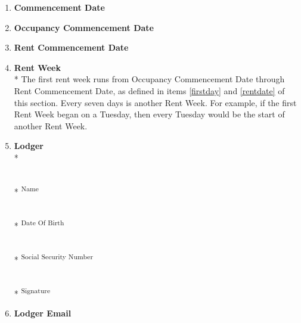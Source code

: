 \documentclass[12pt,letterpaper]{article}
\newcommand{\signdate}{Commencement Date}
\newcommand{\firstday}{Occupancy Commencement Date}
\newcommand{\rentdate}{Rent Commencement Date}
\newcommand{\rentweek}{Rent Week}
\newcommand{\lodger}{Lodger}
\newcommand{\lemail}{Lodger Email}
\begin{document}
\begin{multicols}{2}
\begin{enumerate}
		\item \textbf{\signdate{}} \label{signdate}

			\vspace{0.5cm}\makebox[2in]{\hrulefill}

		\item \textbf{\firstday{}} \label{firstday}

			\vspace{0.5cm}\makebox[2in]{\hrulefill}

		\item \textbf{\rentdate{}} \label{rentdate}
			
			\vspace{0.5cm}\makebox[2in]{\hrulefill}

		\item \textbf{\rentweek{}}\\* \label{rentweek}
			The first rent week runs from \firstday{} through \rentdate{}, as defined in items \ref{firstday} and \ref{rentdate} of this section.  Every seven days is another \rentweek{}. For example, if the first \rentweek{} began on a Tuesday, then every Tuesday would be the start of another \rentweek{}.
			
		\item \textbf{\lodger{}}\\* \label{lodger}
			\begin{minipage}[t]{2in}

				\vspace{0.2cm}\makebox[2in]{\hrulefill} \\*
				\textsuperscript{Name}
				
				\vspace{0.2cm}\makebox[2in]{\hrulefill} \\*
				\textsuperscript{Date Of Birth}
				
				\vspace{0.5cm}\makebox[2in]{\hrulefill} \\*
				\textsuperscript{Social Security Number}
				
				\vspace{0.5cm}\makebox[2in]{\hrulefill} \\*
				\textsuperscript{Signature}
			\end{minipage}%

		\item \textbf{\lemail{}} \label{lemail}

			\vspace{0.5cm}\makebox[2in]{\hrulefill}

			\vspace{0.5cm}\makebox[2in]{\hrulefill}
	\end{enumerate}
\end{multicols}
\end{document}
